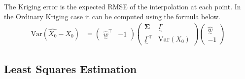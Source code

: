 \documentclass[12pt,a4paper]{article} %
\newcommand{\ve}[1]{\underset{\sim}{#1}}
\begin{document}
The Kriging error is the expected RMSE of the interpolation at each point. In the Ordinary Kriging case it can be computed using the formula below.
\begin{align*}
    \text{Var}(\hat{X_0}-X_0)&=\begin{pmatrix}
        \hat{\ve{w}}^\top&-1
    \end{pmatrix}\begin{pmatrix}
        \pmb{\Sigma} & \ve{\Gamma}\\
        \ve{\Gamma}^\top & \text{Var}(X_0)
    \end{pmatrix}\begin{pmatrix}
        \hat{\ve{w}}\\
        -1
    \end{pmatrix}
\end{align*}

\subsection{Least Squares Estimation}
\label{subsec:lse}
\end{document}
